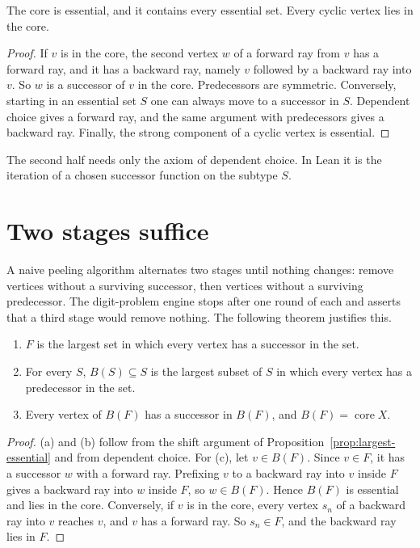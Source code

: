 \begin{proposition}[{\cite[Prop.~2.2.10]{LM95}}]\label{prop:largest-essential}
The core is essential, and it contains every essential set. Every cyclic vertex lies in the
core.
\end{proposition}

\begin{proof}
If \(v\) is in the core, the second vertex \(w\) of a forward ray from \(v\) has a forward ray,
and it has a backward ray, namely \(v\) followed by a backward ray into \(v\). So \(w\) is a
successor of \(v\) in the core. Predecessors are symmetric. Conversely, starting in an essential
set \(S\) one can always move to a successor in \(S\). Dependent choice gives a forward ray, and
the same argument with predecessors gives a backward ray. Finally, the strong component of a
cyclic vertex is essential.
\end{proof}

The second half needs only the axiom of dependent choice. In Lean it is the iteration of a
chosen successor function on the subtype \(S\).

\section{Two stages suffice}

A naive peeling algorithm alternates two stages until nothing changes: remove vertices
without a surviving successor, then vertices without a surviving predecessor. The
digit-problem engine stops after one round of each and asserts that a third stage would remove
nothing. The following theorem justifies this.

\begin{theorem}\label{thm:two-stage}
\begin{enumerate}[label=(\alph*)]
\item \(F\) is the largest set in which every vertex has a successor in the set.
\item For every \(S\), \(B(S)\subseteq S\) is the largest subset of \(S\) in which every vertex
  has a predecessor in the set.
\item Every vertex of \(B(F)\) has a successor in \(B(F)\), and \(B(F)=\operatorname{core}X\).
\end{enumerate}
\end{theorem}

\begin{proof}
(a) and (b) follow from the shift argument of Proposition~\ref{prop:largest-essential} and from
dependent choice. For (c), let \(v\in B(F)\). Since \(v\in F\), it has a successor \(w\) with a
forward ray. Prefixing \(v\) to a backward ray into \(v\) inside \(F\) gives a backward ray
into \(w\) inside \(F\), so \(w\in B(F)\). Hence \(B(F)\) is essential and lies in the core. Conversely, if
\(v\) is in the core, every vertex \(s_n\) of a backward ray into \(v\) reaches \(v\), and \(v\)
has a forward ray. So \(s_n\in F\), and the backward ray lies in \(F\).
\end{proof}

